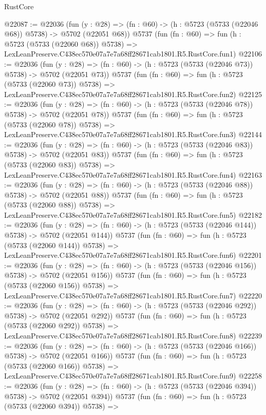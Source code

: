 \begin{lexlean}{RustCore}
\begin{coremodule}
@22087 := @22036
    (fun (y : @28) => (fn : @60) -> (h : @5723 (@5733 (@22046 @68)) @5738) -> @5702 (@22051 @68))
    @5737
    (fun (fn : @60) =>
    fun (h : @5723 (@5733 (@22060 @68)) @5738) =>
    LexLeanPreserve.C438ec570e07a7e7a68ff28671cab1801.R5.RustCore.fun1)
@22106 := @22036
    (fun (y : @28) => (fn : @60) -> (h : @5723 (@5733 (@22046 @73)) @5738) -> @5702 (@22051 @73))
    @5737
    (fun (fn : @60) =>
    fun (h : @5723 (@5733 (@22060 @73)) @5738) =>
    LexLeanPreserve.C438ec570e07a7e7a68ff28671cab1801.R5.RustCore.fun2)
@22125 := @22036
    (fun (y : @28) => (fn : @60) -> (h : @5723 (@5733 (@22046 @78)) @5738) -> @5702 (@22051 @78))
    @5737
    (fun (fn : @60) =>
    fun (h : @5723 (@5733 (@22060 @78)) @5738) =>
    LexLeanPreserve.C438ec570e07a7e7a68ff28671cab1801.R5.RustCore.fun3)
@22144 := @22036
    (fun (y : @28) => (fn : @60) -> (h : @5723 (@5733 (@22046 @83)) @5738) -> @5702 (@22051 @83))
    @5737
    (fun (fn : @60) =>
    fun (h : @5723 (@5733 (@22060 @83)) @5738) =>
    LexLeanPreserve.C438ec570e07a7e7a68ff28671cab1801.R5.RustCore.fun4)
@22163 := @22036
    (fun (y : @28) => (fn : @60) -> (h : @5723 (@5733 (@22046 @88)) @5738) -> @5702 (@22051 @88))
    @5737
    (fun (fn : @60) =>
    fun (h : @5723 (@5733 (@22060 @88)) @5738) =>
    LexLeanPreserve.C438ec570e07a7e7a68ff28671cab1801.R5.RustCore.fun5)
@22182 := @22036
    (fun (y : @28) => (fn : @60) -> (h : @5723 (@5733 (@22046 @144)) @5738) -> @5702 (@22051 @144))
    @5737
    (fun (fn : @60) =>
    fun (h : @5723 (@5733 (@22060 @144)) @5738) =>
    LexLeanPreserve.C438ec570e07a7e7a68ff28671cab1801.R5.RustCore.fun6)
@22201 := @22036
    (fun (y : @28) => (fn : @60) -> (h : @5723 (@5733 (@22046 @156)) @5738) -> @5702 (@22051 @156))
    @5737
    (fun (fn : @60) =>
    fun (h : @5723 (@5733 (@22060 @156)) @5738) =>
    LexLeanPreserve.C438ec570e07a7e7a68ff28671cab1801.R5.RustCore.fun7)
@22220 := @22036
    (fun (y : @28) => (fn : @60) -> (h : @5723 (@5733 (@22046 @292)) @5738) -> @5702 (@22051 @292))
    @5737
    (fun (fn : @60) =>
    fun (h : @5723 (@5733 (@22060 @292)) @5738) =>
    LexLeanPreserve.C438ec570e07a7e7a68ff28671cab1801.R5.RustCore.fun8)
@22239 := @22036
    (fun (y : @28) => (fn : @60) -> (h : @5723 (@5733 (@22046 @166)) @5738) -> @5702 (@22051 @166))
    @5737
    (fun (fn : @60) =>
    fun (h : @5723 (@5733 (@22060 @166)) @5738) =>
    LexLeanPreserve.C438ec570e07a7e7a68ff28671cab1801.R5.RustCore.fun9)
@22258 := @22036
    (fun (y : @28) => (fn : @60) -> (h : @5723 (@5733 (@22046 @394)) @5738) -> @5702 (@22051 @394))
    @5737
    (fun (fn : @60) =>
    fun (h : @5723 (@5733 (@22060 @394)) @5738) =>

\end{coremodule}
\end{lexlean}
